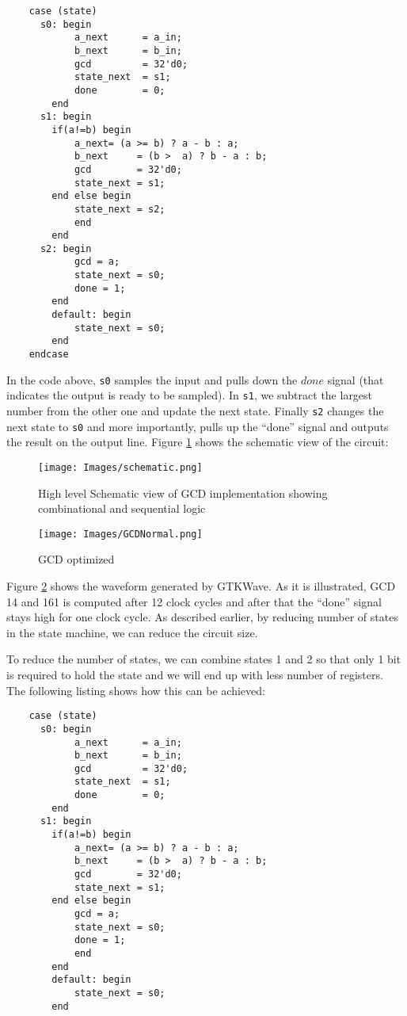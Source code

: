 \begin{verbatim}
    case (state)
      s0: begin
            a_next      = a_in;
            b_next      = b_in;
            gcd         = 32'd0;
            state_next  = s1; 
            done        = 0;
        end
      s1: begin
        if(a!=b) begin
            a_next= (a >= b) ? a - b : a;
            b_next     = (b >  a) ? b - a : b;
            gcd        = 32'd0;
            state_next = s1;
        end else begin
            state_next = s2;
            end
        end
      s2: begin
            gcd = a;
            state_next = s0;
            done = 1;
        end
        default: begin
            state_next = s0;
        end
    endcase
\end{verbatim}

In the code above, \texttt{s0} samples the input and pulls down the $done$ signal (that indicates the output is ready to be sampled). In \texttt{s1}, we subtract the largest number from the other one and update the next state. Finally \texttt{s2} changes the next state to \texttt{s0} and more importantly, pulls up the ``done'' signal and outputs the result on the output line. Figure \ref{SCHEMATIC} shows the schematic view of the circuit:

\begin{figure}[H]
    \centering
    \texttt{[image: Images/schematic.png]}
    \caption{High level Schematic view of GCD implementation showing combinational and sequential logic }
    \label{SCHEMATIC}
\end{figure}

\begin{figure}[H]
    \centering
    \texttt{[image: Images/GCDNormal.png]}
    \caption{GCD optimized}
    \label{GCDNORMAL}
\end{figure}

Figure \ref{GCDNORMAL} shows the waveform generated by GTKWave. As it is illustrated, GCD 14 and 161 is computed after 12 clock cycles and after that the ``done'' signal stays high for one clock cycle. As described earlier, by reducing number of states in the state machine, we can reduce the circuit size.  

To reduce the number of states, we can combine states 1 and 2 so that only 1 bit is required to hold the state and we will end up with less number of registers. The following listing shows how this can be achieved:
\begin{verbatim}
    case (state)
      s0: begin
            a_next      = a_in;
            b_next      = b_in;
            gcd         = 32'd0;
            state_next  = s1; 
            done        = 0;
        end
      s1: begin
        if(a!=b) begin
            a_next= (a >= b) ? a - b : a;
            b_next     = (b >  a) ? b - a : b;
            gcd        = 32'd0;
            state_next = s1;
        end else begin
            gcd = a;
            state_next = s0;
            done = 1;
            end
        end
        default: begin
            state_next = s0;
        end
\end{verbatim}

